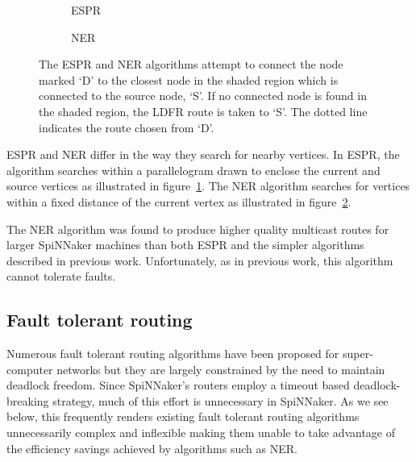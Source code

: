 			\begin{figure}
				\center
				\begin{subfigure}{0.45\linewidth}
					\center
					
					\caption{ESPR}
					\label{fig:search-regions-espr}
				\end{subfigure}
				\begin{subfigure}{0.45\linewidth}
					\center
					
					\caption{NER}
					\label{fig:search-regions-ner}
				\end{subfigure}
				
				\caption[The ESPR and NER multicast routing algorithms.]%
				{The ESPR and NER algorithms attempt to connect the node marked
				`D' to the closest node in the shaded region which is connected to the
				source node, `S'. If no connected node is found in the shaded region, the
				LDFR route is taken to `S'. The dotted line indicates the route chosen
				from `D'.}
				\label{fig:search-regions}
			\end{figure}
			
			ESPR and NER differ in the way they search for nearby vertices. In ESPR,
			the algorithm searches within a parallelogram drawn to enclose the
			current and source vertices as illustrated in
			figure~\ref{fig:search-regions-espr}. The NER algorithm searches for
			vertices within a fixed distance of the current vertex as illustrated in
			figure~\ref{fig:search-regions-ner}.
			
			The NER algorithm was found to produce higher quality multicast routes
			for larger SpiNNaker machines than both ESPR and the simpler algorithms
			described in previous work. Unfortunately, as in previous work, this
			algorithm cannot tolerate faults.
			
		\subsection{Fault tolerant routing}
			
			Numerous fault tolerant routing algorithms have been proposed for
			super-computer networks but they are largely constrained by the need to
			maintain deadlock freedom. Since SpiNNaker's routers employ a timeout
			based deadlock-breaking strategy, much of this effort is unnecessary in
			SpiNNaker. As we see below, this frequently renders existing fault
			tolerant routing algorithms unnecessarily complex and inflexible making
			them unable to take advantage of the efficiency savings achieved by
			algorithms such as NER.
			
